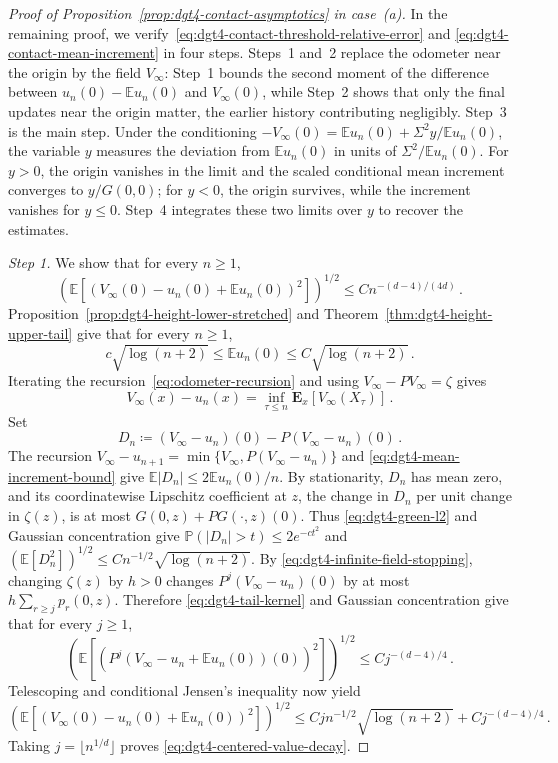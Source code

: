 \documentclass[11pt]{amsart}
\theoremstyle{plain}
\theoremstyle{definition}
\newcommand{\E}{\mathbb{E}}
\renewcommand{\P}{\mathbb{P}}
\begin{document}
\begin{proof}[Proof of Proposition~\ref{prop:dgt4-contact-asymptotics} in case~\textup{(a)}]
	
	In the remaining proof, we verify~\eqref{eq:dgt4-contact-threshold-relative-error} and \eqref{eq:dgt4-contact-mean-increment}
	in four steps. Steps~1 and~2 replace the odometer near the origin by the field $V_\infty$: Step~1 bounds the second moment of the difference between $u_n(0)-\E u_n(0)$ and $V_\infty(0)$, while Step~2 shows that only the final updates near the
	origin matter, the earlier history contributing negligibly. Step~3 is the main step. Under the conditioning
	$-V_\infty(0)=\E u_n(0)+\Sigma^2y/\E u_n(0)$, the variable $y$ measures the deviation from $\E u_n(0)$ in units of $\Sigma^2/\E u_n(0)$. For $y>0$, the origin vanishes in the limit and the scaled conditional mean increment converges to $y/G(0,0)$; for $y<0$, the origin survives, while the increment vanishes for $y\leq0$. Step~4 integrates these two limits over $y$ to
	recover the estimates.

	\noindent\emph{Step 1.} We show that for every $n\geq 1$, 
	\begin{equation}\label{eq:dgt4-centered-value-decay}
		\left(
		\E\left[\left(V_\infty(0)-u_n(0)+\E u_n(0)\right)^2\right]
		\right)^{1/2}
		\leq Cn^{-(d-4)/(4d)}\, .
	\end{equation}
	Proposition~\ref{prop:dgt4-height-lower-stretched} and
	Theorem~\ref{thm:dgt4-height-upper-tail} give that for every $n\geq 1$,
	\begin{equation}\label{eq:dgt4-gaussian-height-order}
		c\sqrt{\log(n+2)}\leq \E u_n(0)\leq C\sqrt{\log(n+2)}\, .
	\end{equation}
		Iterating the recursion~\eqref{eq:odometer-recursion} and using
		$V_\infty-PV_\infty=\zeta$ gives
		\begin{equation}\label{eq:dgt4-infinite-field-stopping}
			V_\infty(x)-u_n(x)
			=
			\inf_{\tau\leq n}\mathbf E_x[V_\infty(X_\tau)]\, .
		\end{equation}
		Set
		\[
			D_n\coloneqq
			(V_\infty-u_n)(0)-P(V_\infty-u_n)(0)\, .
		\]
		The recursion
		$V_\infty-u_{n+1}=\min\{V_\infty,P(V_\infty-u_n)\}$ and
		\eqref{eq:dgt4-mean-increment-bound} give
		$\E|D_n|\leq2\E u_n(0)/n$. By stationarity, $D_n$ has mean zero, and its coordinatewise Lipschitz
		coefficient at $z$, the change in $D_n$ per unit change in $\zeta(z)$, is at most
		$G(0,z)+PG(\mathord\cdot,z)(0)$. Thus
		\eqref{eq:dgt4-green-l2} and Gaussian concentration give
		$\P(|D_n|>t)\leq2e^{-ct^2}$ and
		$\left(\E[D_n^2]\right)^{1/2}\leq Cn^{-1/2}\sqrt{\log(n+2)}$.
		By \eqref{eq:dgt4-infinite-field-stopping}, changing $\zeta(z)$ by $h>0$
		changes $P^j(V_\infty-u_n)(0)$ by at most
		$h\sum_{r\geq j}p_r(0,z)$. Therefore
		\eqref{eq:dgt4-tail-kernel} and Gaussian concentration give that for every $j\geq 1$,
		\[
			\left(\E\left[
			\left(P^j(V_\infty-u_n+\E u_n(0))(0)\right)^2
			\right]\right)^{1/2}
			\leq Cj^{-(d-4)/4}\, .
		\]
		Telescoping and conditional Jensen's inequality now yield
		\[
			\left(\E\left[
			\left(V_\infty(0)-u_n(0)+\E u_n(0)\right)^2
			\right]\right)^{1/2}
			\leq Cj n^{-1/2}\sqrt{\log(n+2)}
			+Cj^{-(d-4)/4}\, .
		\]
		Taking $j=\lfloor n^{1/d}\rfloor$ proves
		\eqref{eq:dgt4-centered-value-decay}.


\end{proof}
\end{document}
